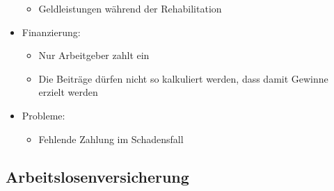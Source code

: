 \documentclass[a4paper, 12pt]{report}
\begin{document}
\begin{multicols}{2}
\begin{itemize}
\begin{itemize}
	    \item Geldleistungen während der Rehabilitation
	\end{itemize}
    \item Finanzierung:
	\begin{itemize}
	    \item Nur Arbeitgeber zahlt ein
	    \item Die Beiträge dürfen nicht so kalkuliert werden, dass damit
		Gewinne erzielt werden
	\end{itemize}
    \item Probleme:
	\begin{itemize}
	    \item Fehlende Zahlung im Schadensfall
	\end{itemize}
\end{itemize}

\subsection{Arbeitslosenversicherung}


\end{multicols}
\end{document}
